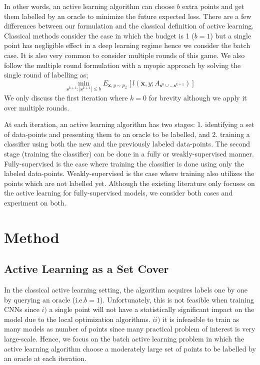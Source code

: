\documentclass{article} %
\makeatletter
\newcommand*{\ie}{i.e.\@\xspace}
\makeatother
\begin{document}
In other words, an active learning algorithm can choose $b$ extra points and get them labelled by an oracle to minimize
the future expected loss. There are a few differences between our formulation and the classical definition of active
learning. Classical methods consider the case in which the budget is 1 ($b=1$) but a single point has negligible effect
in a deep learning regime hence we consider the batch case. It is also very common to consider multiple rounds of this
game. %
We also follow the multiple round formulation with a myopic approach by solving the single round of labelling as;
\begin{equation} \min_{\mathbf{s}^{k+1} : |\mathbf{s}^{k+1}| \leq b} E_{\mathbf{x},y \sim p_\mathcal{Z}}
[l(\mathbf{x},y;A_{\mathbf{s}^{0} \cup \ldots  \mathbf{s}^{k+1}})] \end{equation}
We only discuss the first iteration where $k=0$ for brevity although we apply it over multiple rounds. 

At each iteration, an active learning algorithm has two stages: 1. identifying a set of data-points and presenting them
to an oracle to be labelled, and 2. training a classifier using both the new and the previously labeled data-points. The
second stage (training the classifier) can be done in a fully or weakly-supervised manner. Fully-supervised is the case
where training the classifier is done using only the labeled data-points. Weakly-supervised is the case where training
also utilizes the points which are not labelled yet. Although the existing literature only focuses on the active
learning for fully-supervised models, we consider both cases and experiment on both. 

\section{Method} 
\subsection{Active Learning as a Set Cover} 
In the classical active learning setting, the algorithm acquires
labels one by one by querying an oracle (\ie $b=1$). Unfortunately, this is not feasible when training CNNs since $i)$
a single point will not have a statistically significant impact on the model due to the local optimization algorithms.
$ii)$ it is infeasible to train as many models as number of points since many practical problem of interest is very
large-scale. Hence, we focus on the batch active learning problem in
which the active learning algorithm choose a moderately large set of points to be labelled by an oracle at each
iteration.
\end{document}
